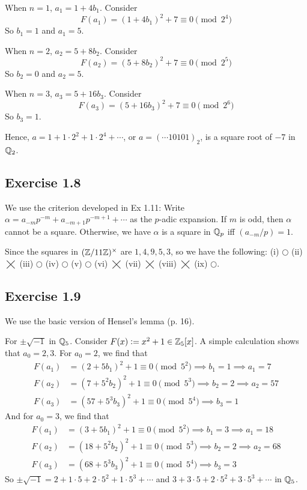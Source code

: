 \documentclass[../Koblitz.tex]{subfiles}
\begin{document}
When $n=1$, $a_1=1+4b_1$. Consider $$F(a_1)=(1+4b_1)^2+7\equiv 0\pmod{2^4}$$ So $b_1=1$ and $a_1=5$.

When $n=2$, $a_2=5+8b_2$. Consider $$F(a_2)=(5+8b_2)^2+7\equiv 0\pmod{2^5}$$ So $b_2=0$ and $a_2=5$.

When $n=3$, $a_3=5+16b_3$. Consider $$F(a_3)=(5+16b_3)^2+7\equiv 0\pmod{2^6}$$ So $b_3=1$.

Hence, $a=1+1\cdot2^2+1\cdot2^4+\cdots$, or $a=(\cdots10101)_2$, is a square root of $-7$ in $\mathbb{Q}_2$.

\subsection*{Exercise 1.8}

We use the criterion developed in Ex 1.11: Write $\alpha=a_{-m}p^{-m}+a_{-m+1}p^{-m+1}+\cdots$ as the $p$-adic expansion. If $m$ is odd, then $\alpha$ cannot be a square. Otherwise, we have $\alpha$ is a square in $\mathbb{Q}_p$ iff $(a_{-m}/p)=1$.

Since the squares in $(\mathbb{Z}/11\mathbb{Z})^\times$ are $1,4,9,5,3$, so we have the following: (i) $\bigcirc$ (ii) $\bigtimes$ (iii) $\bigcirc$ (iv) $\bigcirc$ (v) $\bigcirc$ (vi) $\bigtimes$ (vii) $\bigtimes$ (viii) $\bigtimes$ (ix) $\bigcirc$.

\subsection*{Exercise 1.9}

We use the basic version of Hensel's lemma (p. 16).

For $\pm\sqrt{-1}$ in $\mathbb{Q}_5$. Consider $F(x):=x^2+1\in\mathbb{Z}_5[x]$. A simple calculation shows that $a_0=2,3$. For $a_0=2$, we find that
\begin{align*}
F(a_1)&=(2+5b_1)^2+1\equiv 0\pmod{5^2} \implies b_1=1 \implies a_1=7 \\
F(a_2)&=(7+5^2b_2)^2+1\equiv 0\pmod{5^3} \implies b_2=2 \implies a_2=57 \\
F(a_3)&=(57+5^3b_3)^2+1\equiv 0\pmod{5^4} \implies b_3=1
\end{align*}
And for $a_0=3$, we find that
\begin{align*}
F(a_1)&=(3+5b_1)^2+1\equiv 0\pmod{5^2} \implies b_1=3 \implies a_1=18 \\
F(a_2)&=(18+5^2b_2)^2+1\equiv 0\pmod{5^3} \implies b_2=2 \implies a_2=68 \\
F(a_3)&=(68+5^3b_3)^2+1\equiv 0\pmod{5^4} \implies b_3=3
\end{align*}
So $\pm\sqrt{-1}=2+1\cdot5+2\cdot5^2+1\cdot5^3+\cdots$ and $3+3\cdot5+2\cdot5^2+3\cdot5^3+\cdots$ in $\mathbb{Q}_5$.
\end{document}
